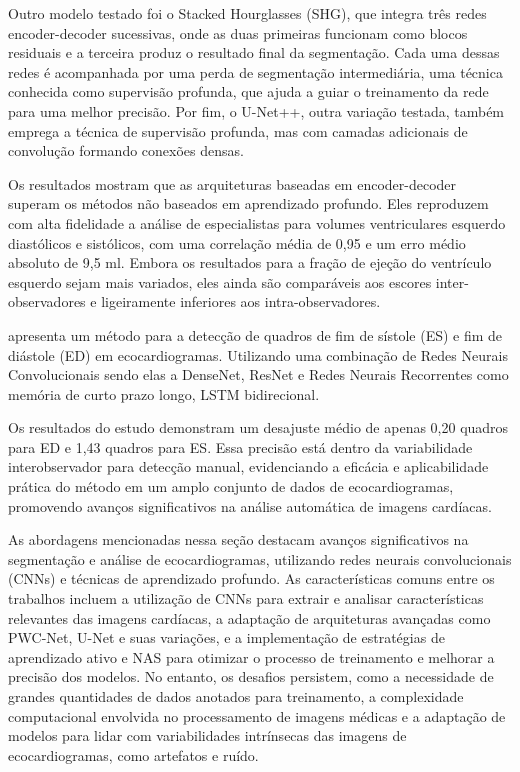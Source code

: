 Outro modelo testado foi o Stacked Hourglasses (SHG), que integra três redes encoder-decoder sucessivas, onde as duas primeiras funcionam como blocos residuais e a terceira produz o resultado final da segmentação. Cada uma dessas redes é acompanhada por uma perda de segmentação intermediária, uma técnica conhecida como supervisão profunda, que ajuda a guiar o treinamento da rede para uma melhor precisão. Por fim, o U-Net++, outra variação testada, também emprega a técnica de supervisão profunda, mas com camadas adicionais de convolução formando conexões densas.

Os resultados mostram que as arquiteturas baseadas em encoder-decoder superam os métodos não baseados em aprendizado profundo. Eles reproduzem com alta fidelidade a análise de especialistas para volumes ventriculares esquerdo diastólicos e sistólicos, com uma correlação média de 0,95 e um erro médio absoluto de 9,5 ml. Embora os resultados para a fração de ejeção do ventrículo esquerdo sejam mais variados, eles ainda são comparáveis aos escores inter-observadores e ligeiramente inferiores aos intra-observadores.


\textcite{8586941} apresenta um método  para a detecção de quadros de fim de sístole (ES) e fim de diástole (ED) em ecocardiogramas. Utilizando uma combinação de Redes Neurais Convolucionais sendo elas a DenseNet, ResNet e Redes Neurais Recorrentes como memória de curto prazo longo, LSTM bidirecional.

Os resultados do estudo demonstram um desajuste médio de apenas 0,20 quadros para ED e 1,43 quadros para ES. Essa precisão está dentro da variabilidade interobservador para detecção manual, evidenciando a eficácia e aplicabilidade prática do método em um amplo conjunto de dados de ecocardiogramas, promovendo avanços significativos na análise automática de imagens cardíacas.

As abordagens mencionadas nessa seção  destacam avanços significativos na segmentação e análise de ecocardiogramas, utilizando redes neurais convolucionais (CNNs) e técnicas de aprendizado profundo. As características comuns entre os trabalhos incluem a utilização de CNNs para extrair e analisar características relevantes das imagens cardíacas, a adaptação de arquiteturas avançadas como PWC-Net, U-Net e suas variações, e a implementação de estratégias de aprendizado ativo e NAS para otimizar o processo de treinamento e melhorar a precisão dos modelos. No entanto, os desafios persistem, como a necessidade de grandes quantidades de dados anotados para treinamento, a complexidade computacional envolvida no processamento de imagens médicas e a adaptação de modelos para lidar com variabilidades intrínsecas das imagens de ecocardiogramas, como artefatos e ruído.

